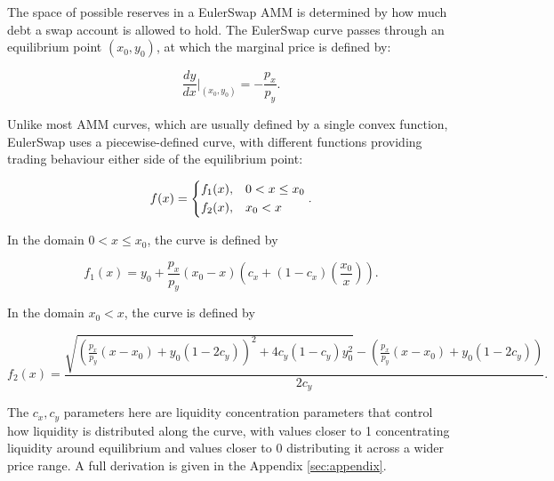 \documentclass{article}
\begin{document}
The space of possible reserves in a EulerSwap AMM is determined by how much debt a swap account is allowed to hold. The EulerSwap curve passes through an equilibrium point $(x_0, y_0)$, at which the marginal price is defined by:

\begin{equation}
\frac{dy}{dx} \Big|_{(x_0, y_0)} = -\frac{p_x}{p_y}.
\end{equation}

Unlike most AMM curves, which are usually defined by a single convex function, EulerSwap uses a piecewise-defined curve, with different functions providing trading behaviour either side of the equilibrium point:

\begin{equation}
    \label{eq:fx-main}
    f(x) =
    \begin{dcases}
        f_1(x), 
        & 0 < x \leq x_0 \\
        f_2(x), 
        & x_0 < x
    \end{dcases}.
\end{equation}

In the domain $0 < x \leq x_0$, the curve is defined by

\begin{equation}
    \label{eq:fx1-main}
    f_1(x) 
    =
    y_{0}+\frac{p_{x}}{p_{y}}\left(x_{0}-x\right)\left(c_{x}+\left(1-c_{x}\right)\left(\frac{x_{0}}{x}\right)\right).
\end{equation}

In the domain $x_0 < x$, the curve is defined by

\begin{equation}
    \label{eq:fx2-main}
    f_2(x) 
    =
    \frac{
        \sqrt{
            \left( \frac{p_x}{p_y} (x - x_0) + y_0 (1 - 2c_y) \right)^2 
            + 4c_y (1 - c_y) y_0^2
        } 
        - \left( \frac{p_x}{p_y} (x - x_0) + y_0 (1 - 2c_y) \right)
    }{2c_y}.
\end{equation}

 The $c_x, c_y$ parameters here are liquidity concentration parameters that control how liquidity is distributed along the curve, with values closer to 1 concentrating liquidity around equilibrium and values closer to 0 distributing it across a wider price range. A full derivation is given in the Appendix \ref{sec:appendix}.  
 
\end{document}
